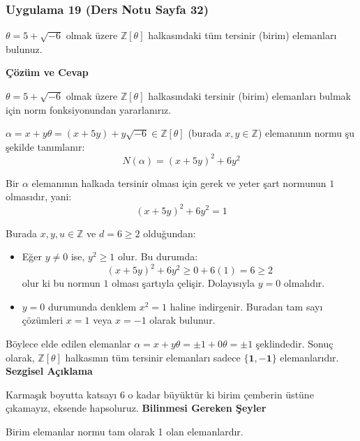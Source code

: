\documentclass[11pt, a4paper]{article}
\newenvironment{cozum}{
    \vspace{0.5cm}
    \noindent\textcolor{green!60!black}{\faCheckCircle\enspace \textbf{\Large Çözüm ve Cevap}}\par\vspace{0.2cm}
}{}
\newenvironment{sezgisel}{
    \vspace{0.5cm}
    \noindent\textcolor{orange!80!black}{\faLightbulb\enspace \textbf{\Large Sezgisel Açıklama}}\par\vspace{0.2cm}
    \itshape
}{}
\newenvironment{bilgi}{
    \vspace{0.5cm}
    \noindent\textcolor{red!70!black}{\faExclamationTriangle\enspace \textbf{\Large Bilinmesi Gereken Şeyler}}\par\vspace{0.2cm}
}{}
\begin{document}
\subsubsection{Uygulama 19 (Ders Notu Sayfa 32)}
\begin{sorubox}
$\theta = 5 + \sqrt{-6}$ olmak üzere $\mathbb{Z}[\theta]$ halkasındaki tüm tersinir (birim) elemanları bulunuz.
\end{sorubox}
\begin{cozum}
$\theta = 5 + \sqrt{-6}$ olmak üzere $\mathbb{Z}[\theta]$ halkasındaki tersinir (birim) elemanları bulmak için norm fonksiyonundan yararlanırız.

$\alpha = x + y\theta = (x + 5y) + y\sqrt{-6} \in \mathbb{Z}[\theta]$ (burada $x, y \in \mathbb{Z}$) elemanının normu şu şekilde tanımlanır:
\[ N(\alpha) = (x + 5y)^2 + 6 y^2 \]

Bir $\alpha$ elemanının halkada tersinir olması için gerek ve yeter şart normunun $1$ olmasıdır, yani:
\[ (x + 5y)^2 + 6 y^2 = 1 \]

Burada $x, y, u \in \mathbb{Z}$ ve $d = 6 \ge 2$ olduğundan:
\begin{itemize}
    \item Eğer $y \neq 0$ ise, $y^2 \ge 1$ olur. Bu durumda:
    \[ (x + 5y)^2 + 6 y^2 \ge 0 + 6(1) = 6 \ge 2 \]
    olur ki bu normun $1$ olması şartıyla çelişir. Dolayısıyla $y = 0$ olmalıdır.
    \item $y = 0$ durumunda denklem $x^2 = 1$ haline indirgenir. Buradan tam sayı çözümleri $x = 1$ veya $x = -1$ olarak bulunur.
\end{itemize}

Böylece elde edilen elemanlar $\alpha = x + y\theta = \pm 1 + 0\theta = \pm 1$ şeklindedir. Sonuç olarak, $\mathbb{Z}[\theta]$ halkasının tüm tersinir elemanları sadece $\mathbf{\{1, -1\}}$ elemanlarıdır.
\end{cozum}
\begin{sezgisel}
Karmaşık boyutta katsayı 6 o kadar büyüktür ki birim çemberin üstüne çıkamayız, eksende hapsoluruz.
\end{sezgisel}
\begin{bilgi}
Birim elemanlar normu tam olarak 1 olan elemanlardır.
\end{bilgi}

\newpage
\end{document}
